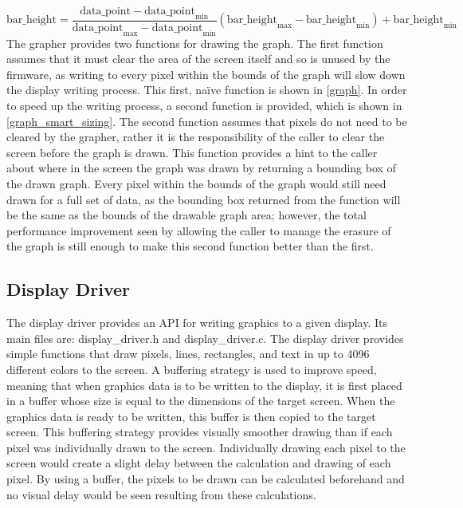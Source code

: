 \begin{equation} %
\text{bar\_height} = \frac{\text{data\_point}-\text{data\_point}_\text{min}}{\text{data\_point}_\text{max}-\text{data\_point}_\text{min}}(\text{bar\_height}_\text{max}-\text{bar\_height}_\text{min}) + \text{bar\_height}_\text{min}
\end{equation}
\nl
\indent The grapher provides two functions for drawing the graph. The first function assumes that it must clear the area of the screen itself and so is unused by the firmware, as writing to every pixel within the bounds of the graph will slow down the display writing process. This first, na\"ive function is shown in \ref{graph}. In order to speed up the writing process, a second function is provided, which is shown in \ref{graph_smart_sizing}. The second function assumes that pixels do not need to be cleared by the grapher, rather it is the responsibility of the caller to clear the screen before the graph is drawn. This function provides a hint to the caller about where in the screen the graph was drawn by returning a bounding box of the drawn graph. Every pixel within the bounds of the graph would still need drawn for a full set of data, as the bounding box returned from the function will be the same as the bounds of the drawable graph area; however, the total performance improvement seen by allowing the caller to manage the erasure of the graph is still enough to make this second function better than the first.

\subsection{Display Driver}
The display driver provides an API for writing graphics to a given display. Its main files are: display\_driver.h and display\_driver.c. The display driver provides simple functions that draw pixels, lines, rectangles, and text in up to 4096 different colors to the screen. A buffering strategy is used to improve speed, meaning that when graphics data is to be written to the display, it is first placed in a buffer whose size is equal to the dimensions of the target screen. When the graphics data is ready to be written, this buffer is then copied to the target screen. This buffering strategy provides visually smoother drawing than if each pixel was individually drawn to the screen. Individually drawing each pixel to the screen would create a slight delay between the calculation and drawing of each pixel. By using a buffer, the pixels to be drawn can be calculated beforehand and no visual delay would be seen resulting from these calculations.

